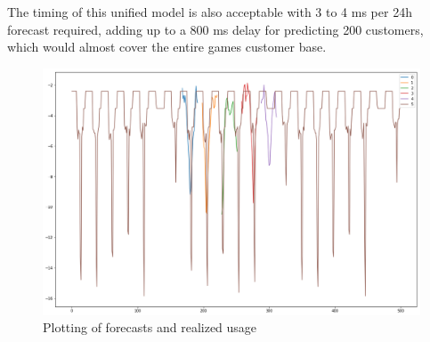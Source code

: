 The timing of this unified model is also acceptable with 3 to 4 ms per 24h forecast required, adding up to a 800 ms
delay for predicting 200 customers, which would almost cover the entire games customer base.

\begin{figure}
    \centering
    \includegraphics[width =1.0\linewidth]{img/pred1.png}
    \caption{Plotting of forecasts and realized usage}
    \label{fig:imgcombined_model}
\end{figure}



%

